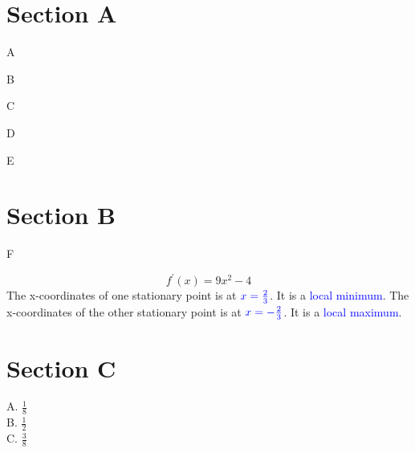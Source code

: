 \documentclass[a4paper]{tufte-handout}
\begin{document}
\begin{question}
  
\section{Section A}
\begin{exam_question}
A
\end{exam_question}

\begin{exam_question}
B
\end{exam_question}
\begin{exam_question}
C
\end{exam_question}
\begin{exam_question}
D
\end{exam_question}
\begin{exam_question}
E
\end{exam_question}


\section{Section B}
\begin{exam_question}
F
\end{exam_question}
\begin{exam_question}
  \[ f^{\prime}(x) = 9x^{2} -4 \]
  The x-coordinates of one stationary point is at \( \mathcolor{blue}{x=\frac{2}{3}} \). It is a \textcolor{blue}{local minimum}.
  The x-coordinates of the other stationary point is at \( \mathcolor{blue}{x=-\frac{2}{3}} \). It is a \textcolor{blue}{local maximum}.
\end{exam_question}


\section{Section C}
\begin{exam_question}

  A. \( \frac{1}{8} \)\\[8pt]
  B. \( \frac{1}{2} \)\\[8pt]
  C. \( \frac{3}{8} \)\\
\end{exam_question}



\end{question}
\end{document}

